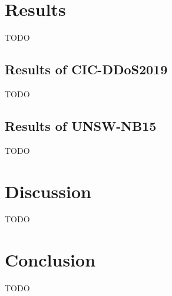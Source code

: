 \documentclass{article}
\begin{document}
\section{Results}

TODO

\subsection{Results of CIC-DDoS2019}

TODO

\subsection{Results of UNSW-NB15}

TODO

\section{Discussion}

TODO


\section{Conclusion}

TODO 



\end{document}
